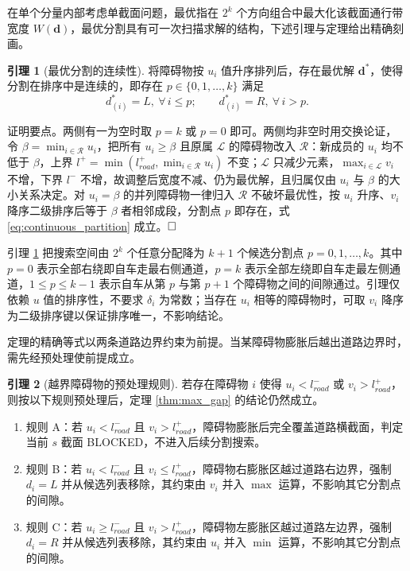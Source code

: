 \documentclass[a4paper,zihao=5]{ctexart}
\theoremstyle{definition}
\newtheorem{lemma}{引理}[section]
\begin{document}
在单个分量内部考虑单截面问题，最优指在 $2^k$ 个方向组合中最大化该截面通行带宽度 $W(\mathbf{d})$，最优分割具有可一次扫描求解的结构，下述引理与定理给出精确刻画。

\begin{lemma}[最优分割的连续性]
\label{lem:continuous_partition}
将障碍物按 $u_i$ 值升序排列后，存在最优解 $\mathbf{d}^{*}$，使得分割在排序中是连续的，即存在 $p \in \{0, 1, \ldots, k\}$ 满足
\begin{equation}
    d_{(i)}^{*} = L,\ \forall\, i \leq p; \qquad d_{(i)}^{*} = R,\ \forall\, i > p.
    \label{eq:continuous_partition}
\end{equation}
\end{lemma}

证明要点。两侧有一为空时取 $p=k$ 或 $p=0$ 即可。两侧均非空时用交换论证，令 $\beta = \min_{i \in \mathcal{R}} u_i$，把所有 $u_i \geq \beta$ 且原属 $\mathcal{L}$ 的障碍物改入 $\mathcal{R}$：新成员的 $u_i$ 均不低于 $\beta$，上界 $l^{+} = \min(l_{road}^{+}, \min_{i\in\mathcal{R}} u_i)$ 不变；$\mathcal{L}$ 只减少元素，$\max_{i \in \mathcal{L}} v_i$ 不增，下界 $l^{-}$ 不增，故调整后宽度不减、仍为最优解，且归属仅由 $u_i$ 与 $\beta$ 的大小关系决定。对 $u_i = \beta$ 的并列障碍物一律归入 $\mathcal{R}$ 不破坏最优性，按 $u_i$ 升序、$v_i$ 降序二级排序后等于 $\beta$ 者相邻成段，分割点 $p$ 即存在，式 \eqref{eq:continuous_partition} 成立。$\hfill\Box$

引理 \ref{lem:continuous_partition} 把搜索空间由 $2^k$ 个任意分配降为 $k+1$ 个候选分割点 $p = 0, 1, \ldots, k$。其中 $p=0$ 表示全部右绕即自车走最右侧通道，$p=k$ 表示全部左绕即自车走最左侧通道，$1 \leq p \leq k-1$ 表示自车从第 $p$ 与第 $p+1$ 个障碍物之间的间隙通过。引理仅依赖 $u$ 值的排序性，不要求 $\delta_i$ 为常数；当存在 $u_i$ 相等的障碍物时，可取 $v_i$ 降序为二级排序键以保证排序唯一，不影响结论。

定理的精确等式以两条道路边界约束为前提。当某障碍物膨胀后越出道路边界时，需先经预处理使前提成立。

\begin{lemma}[越界障碍物的预处理规则]
\label{lem:boundary_trim}
若存在障碍物 $i$ 使得 $u_i < l_{road}^{-}$ 或 $v_i > l_{road}^{+}$，则按以下规则预处理后，定理 \ref{thm:max_gap} 的结论仍然成立。
\begin{enumerate}
    \item 规则 A：若 $u_i < l_{road}^{-}$ 且 $v_i > l_{road}^{+}$，障碍物膨胀后完全覆盖道路横截面，判定当前 $s$ 截面 BLOCKED，不进入后续分割搜索。
    \item 规则 B：若 $u_i < l_{road}^{-}$ 且 $v_i \leq l_{road}^{+}$，障碍物右膨胀区越过道路右边界，强制 $d_i = L$ 并从候选列表移除，其约束由 $v_i$ 并入 $\max$ 运算，不影响其它分割点的间隙。
    \item 规则 C：若 $u_i \geq l_{road}^{-}$ 且 $v_i > l_{road}^{+}$，障碍物左膨胀区越过道路左边界，强制 $d_i = R$ 并从候选列表移除，其约束由 $u_i$ 并入 $\min$ 运算，不影响其它分割点的间隙。
\end{enumerate}
\end{lemma}
\end{document}
